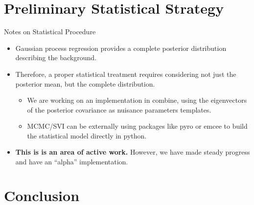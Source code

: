 \documentclass[10pt]{beamer}
\begin{document}
\section[Statistical Considerations]{Preliminary Statistical Strategy}

\begin{frame}{Notes on Statistical Procedure}
  \begin{itemize}
  \item Gaussian process regression provides a complete posterior distribution describing the background. 
  \item Therefore, a proper statistical treatment requires considering not just the posterior mean, but the complete distribution.
    \begin{itemize}
    \item We are working on an implementation in combine, using the eigenvectors of the posterior covariance as nuisance parameters templates. 
    \item MCMC/SVI can be externally using packages like pyro or emcee to build the statistical model directly in python.
    \end{itemize}
  \item {\bfseries This is is an area of active work. } However, we have made steady progress and have an ``alpha'' implementation.
  \end{itemize}


\end{frame}

%   
%   


\section{Conclusion}
\label{sec:conclusion}
\end{document}
